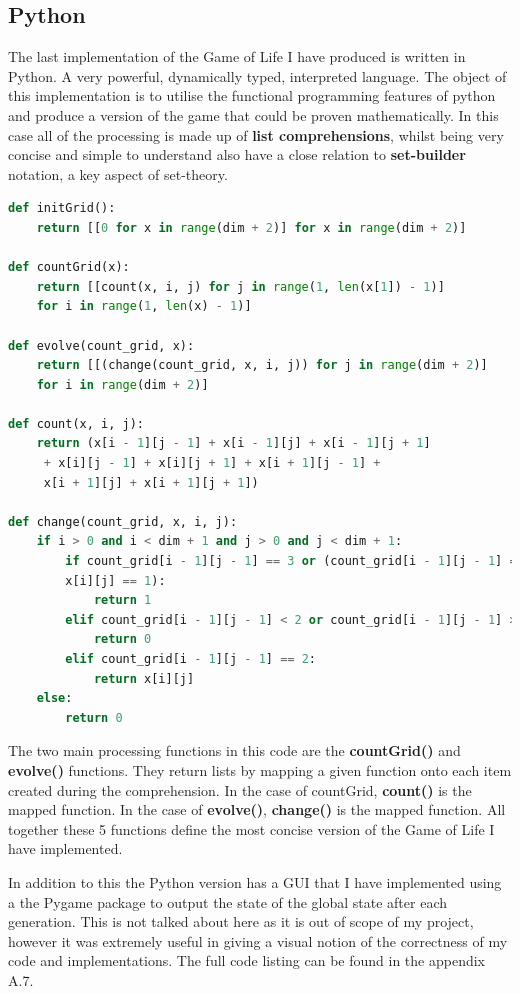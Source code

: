\documentclass[11pt]{article} %
\begin{document}
\subsection{Python}
The last implementation of the Game of Life I have produced is written in Python. A very powerful, dynamically typed, interpreted language. The object of this implementation is to utilise the functional programming features of python and produce a version of the game that could be proven mathematically. In this case all of the processing is made up of {\bf list comprehensions}, whilst being very concise and simple to understand also have a close relation to {\bf set-builder} notation, a key aspect of set-theory.
\begin{lstlisting}[language=Python,caption={A Python Game of Life using List Comprehensions}]
def initGrid():
    return [[0 for x in range(dim + 2)] for x in range(dim + 2)]
    
def countGrid(x):
    return [[count(x, i, j) for j in range(1, len(x[1]) - 1)]
    for i in range(1, len(x) - 1)]    

def evolve(count_grid, x):
    return [[(change(count_grid, x, i, j)) for j in range(dim + 2)]
    for i in range(dim + 2)]

def count(x, i, j):
    return (x[i - 1][j - 1] + x[i - 1][j] + x[i - 1][j + 1]
     + x[i][j - 1] + x[i][j + 1] + x[i + 1][j - 1] +
     x[i + 1][j] + x[i + 1][j + 1])
     
def change(count_grid, x, i, j):
    if i > 0 and i < dim + 1 and j > 0 and j < dim + 1:
        if count_grid[i - 1][j - 1] == 3 or (count_grid[i - 1][j - 1] == 2 and
        x[i][j] == 1):
            return 1
        elif count_grid[i - 1][j - 1] < 2 or count_grid[i - 1][j - 1] > 3:
            return 0
        elif count_grid[i - 1][j - 1] == 2:
            return x[i][j]
    else:
        return 0     
\end{lstlisting}
The two main processing functions in this code are the {\bf countGrid()} and {\bf evolve()} functions. They return lists by mapping a given function onto each item created during the comprehension. In the case of countGrid, {\bf count()} is the mapped function. In the case of {\bf evolve()}, {\bf change()} is the mapped function. All together these 5 functions define the most concise version of the Game of Life I have implemented.

In addition to this the Python version has a GUI that I have implemented using a the Pygame package to output the state of the global state after each generation. This is not talked about here as it is out of scope of my project, however it was extremely useful in giving a visual notion of the correctness of my code and implementations. The full code listing can be found in the appendix A.7.
\end{document}
